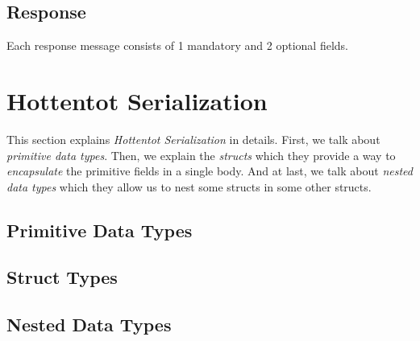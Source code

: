 \documentclass[10pt,a4paper]{article}
\begin{document}
\begin{flushleft}
\end{flushleft}

\subsection{Response}
Each response message consists of 1 mandatory and 2 optional fields.

\begin{flushleft}
\end{flushleft}

\section{Hottentot Serialization}
This section explains \textit{Hottentot Serialization} in details. First, we talk about \textit{primitive data types}. Then, we explain the \textit{structs} which they provide a way to \textit{encapsulate} the primitive fields in a single body. And at last, we talk about \textit{nested data types} which they allow us to nest some structs in some other structs.

\subsection{Primitive Data Types}
\subsection{Struct Types}
\subsection{Nested Data Types}
\end{document}
